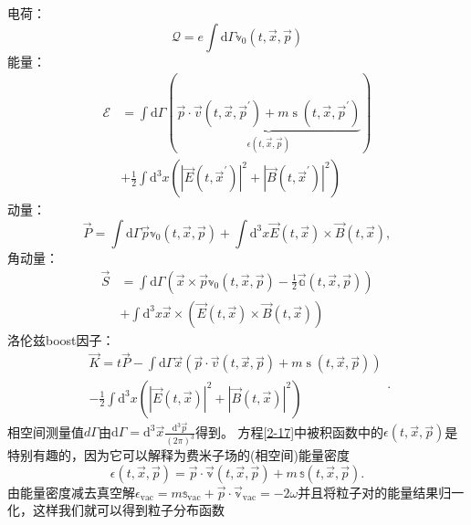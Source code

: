 电荷：
\begin{equation}
\mathcal{Q}=e\int\mathrm{d}\Gamma\mathbb{v}_0(t,\vec{x},\vec{p})   
\end{equation}
能量：
\begin{equation}\label{2-17}
\begin{aligned}\mathcal{E}&=\int\mathrm{d}\Gamma\left(\underbrace{\vec{p}\cdot\vec{v}(t,\vec{x},\vec{p}^{\prime})+m\operatorname{s}(t,\vec{x},\vec{p}^{\prime})}_{\epsilon(t,\vec{x},\vec{p})}\right)\\&+\frac12\int\mathrm{d}^3x\left(\left|\vec{E}(t,\vec{x}^{\prime})\right|^2+\left|\vec{B}(t,\vec{x}^{\prime})\right|^2\right)\end{aligned}
\end{equation}
动量：
\begin{equation}  \vec{P}=\int\mathrm{d}\Gamma\vec{p}\mathbb{v}_0(t,\vec{x},\vec{p})+\int\mathrm{d}^3x\vec{E}(t,\vec{x})\times\vec{B}(t,\vec{x}),
\end{equation}
角动量：
\begin{equation}\begin{aligned}\vec{S}&=\int\mathrm{d}\Gamma\left(\vec{x}\times\vec{p}\mathbb{v}_0(t,\vec{x},\vec{p})-\frac12\vec{\mathbb{a}} ( t , \vec { x },\vec{p})\right)\\&+\int\mathrm{d}^3x\vec{x}\times\left(\vec{E}(t,\vec{x})\times\vec{B}(t,\vec{x})\right)\end{aligned}\end{equation}
洛伦兹boost因子：
\begin{equation}\begin{aligned}\vec{K}=t\vec{P}-\int\mathrm{d}\Gamma\left.\vec{x}\left(\vec{p}\cdot\vec{v}(t,\vec{x},\vec{p})+m\operatorname{s}(t,\vec{x},\vec{p})\right)\right.\\-\frac12\int\mathrm{d}^3x\left(\left|\vec{E}(t,\vec{x})\right|^2+\left|\vec{B}(t,\vec{x})\right|^2\right)\end{aligned}.
\end{equation}
相空间测量值$d\Gamma$由$\mathrm{d}\Gamma=\mathrm{d}^3\vec{x}\frac{\mathrm{d}^3\vec{p}}{\left(2\pi\right)^3}$得到。
方程\ref{2-17}中被积函数中的$\epsilon(t,\vec{x},\vec{p})$是特别有趣的，因为它可以解释为费米子场的(相空间)能量密度
\begin{equation}\label{2-21}
     \epsilon(t,\vec{x},\vec{p}) = \vec{p}\cdot \vec{\mathbb{v}}(t,\vec{x},\vec{p})+m\,\mathbb{s}(t,\vec{x},\vec{p}) .
\end{equation}
由能量密度减去真空解$\epsilon_\mathrm{vac} =  m \mathbb{s}_\mathrm{vac} +\vec{p}\cdot\vec{\mathbb{v}}_\mathrm{vac} = -2\omega $并且将粒子对的能量结果归一化，这样我们就可以得到粒子分布函数
